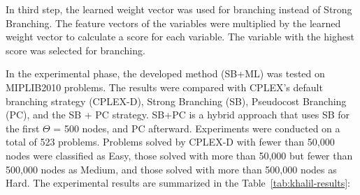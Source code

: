In third step, the learned weight vector was used for branching instead of Strong Branching.
The feature vectors of the variables were multiplied by the learned weight vector to calculate a score for each variable.
The variable with the highest score was selected for branching.


In the experimental phase, the developed method (SB+ML) was tested on MIPLIB2010 problems.
The results were compared with CPLEX's default branching strategy (CPLEX-D), Strong Branching (SB), Pseudocost Branching (PC), and the SB + PC strategy. SB+PC is a hybrid approach that uses SB for the first $\Theta$ = 500 nodes, and PC afterward.
Experiments were conducted on a total of 523 problems.
Problems solved by CPLEX-D with fewer than 50,000 nodes were classified as Easy, those solved with more than 50,000 but fewer than 500,000 nodes as Medium, and those solved with more than 500,000 nodes as Hard.
The experimental results are summarized in the Table~\ref{tab:khalil-results}:

